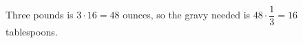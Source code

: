 Three pounds is $3\cdot16=48$ ounces, so the gravy needed is $48\cdot\dfrac13=\boxed{16}$ tablespoons.
